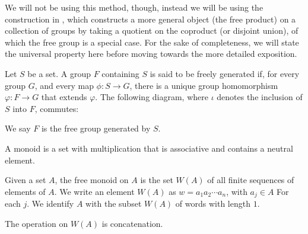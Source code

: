 We will not be using this method, though, instead we will be using the construction in \cite{delaHarpe_topics_in_geometric_group_theory}, which constructs a more general object (the free product) on a collection of groups by taking a quotient on the coproduct (or disjoint union), of which the free group is a special case. For the sake of completeness, we will state the universal property here before moving towards the more detailed exposition.
\begin{definition}
  Let $S$ be a set. A group $F$ containing $S$ is said to be freely generated if, for every group $G$, and every map $\phi\colon S\rightarrow G$, there is a unique group homomorphism $\varphi\colon F\rightarrow G$ that extends $\varphi$. The following diagram, where $\iota$ denotes the inclusion of $S$ into $F$, commutes:
  \begin{center}
  \end{center}
We say $F$ is the {free group} generated by $S$.
\end{definition}
\begin{definition}
  A {monoid} is a set with multiplication that is associative and contains a neutral element.\newline

  Given a set $A$, the free monoid on $A$ is the set $W(A)$ of all finite sequences of elements of $A$. We write an element $W(A)$ as $w = a_1a_2\cdots a_n$, with $a_j\in A$ For each $j$. We identify $A$ with the subset $W(A)$ of words with length $1$.\newline

  The operation on $W(A)$ is concatenation.
\end{definition}

